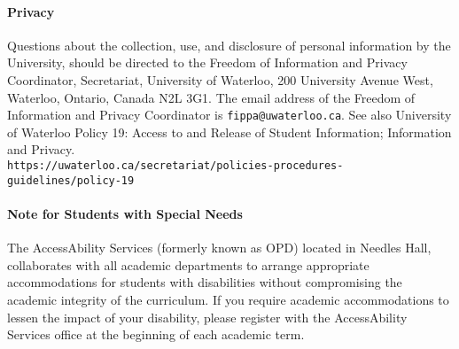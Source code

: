 \paragraph{Privacy}
Questions about the collection, use, and disclosure of personal information by the University, should be directed to the Freedom of Information and Privacy Coordinator, Secretariat, University of Waterloo, 200 University Avenue West, Waterloo, Ontario, Canada N2L 3G1. The email address of the Freedom of Information and Privacy Coordinator is \texttt{fippa@uwaterloo.ca}. See also University of Waterloo Policy 19: Access to and Release of Student Information; Information and Privacy.
\\ \texttt{https://uwaterloo.ca/secretariat/policies-procedures-guidelines/policy-19}

\paragraph{Note for Students with Special Needs}
The AccessAbility Services (formerly known as OPD) located in Needles Hall, collaborates with all academic departments to arrange appropriate accommodations for students with disabilities without compromising the academic integrity of the curriculum. If you require academic accommodations to lessen the impact of your disability, please register with the AccessAbility Services office at the beginning of each academic term.

